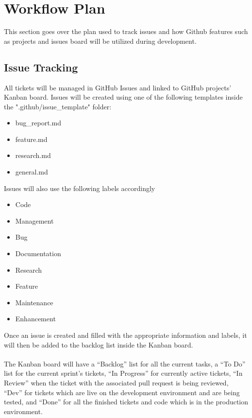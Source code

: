 \documentclass[12pt, titlepage]{article}
\begin{document}
\section{Workflow Plan}
This section goes over the plan used to track issues and how Github features such as projects and issues board will be utilized during development.
\subsection{Issue Tracking}
All tickets will be managed in GitHub Issues and linked to GitHub projects' Kanban board. Issues will be created using one of the following templates inside the ".github/issue\_template" folder:
\begin{itemize}
\item bug\_report.md
\item feature.md
\item research.md
\item general.md
\end{itemize}
Issues will also use the following labels accordingly
\begin{itemize}
\item Code
\item Management
\item Bug
\item Documentation
\item Research
\item Feature
\item Maintenance
\item Enhancement
\end{itemize}

Once an issue is created and filled with the appropriate information and labels, it will then be
added to the backlog list inside the Kanban board.\\\\
The Kanban board will have a “Backlog” list for all the current tasks, a “To Do” list for the current
sprint’s tickets, “In Progress” for currently active tickets, “In Review” when the ticket with the
associated pull request is being reviewed, “Dev” for tickets which are live on the development
environment and are being tested, and “Done” for all the finished tickets and code which is in
the production environment.
\end{document}
